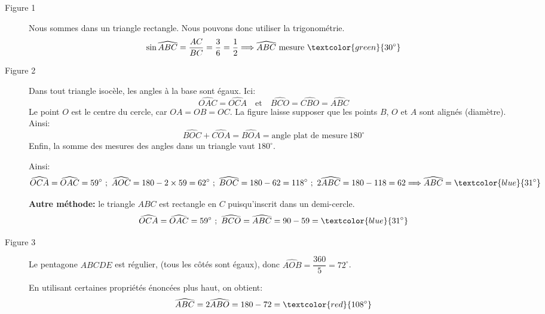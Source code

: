 \begin{description}
\item[Figure 1] Nous sommes dans un triangle rectangle. Nous pouvons donc utiliser la trigonométrie.
\[
\sin\widehat{ABC}=\frac{AC}{BC}=\frac{3}{6}=\frac{1}{2}\Longrightarrow \widehat{ABC}\ \text{mesure}\ \textcolor{green}{30^{\circ}}
\]
\item[Figure 2] Dans tout triangle isocèle, les angles à la base sont égaux. Ici:
\[
\widehat{OAC}=\widehat{OCA}\quad\text{et}\quad\widehat{BCO}=\widehat{CBO}=\widehat{ABC}
\]
Le point $O$ est le centre du cercle, car $OA=OB=OC$. La figure laisse supposer que les points $B$, $O$ et $A$ sont alignés (diamètre). Ainsi:
\[
\widehat{BOC}+\widehat{COA}=\widehat{BOA}=\text{angle plat de mesure}\ 180^{\circ}
\]
Enfin, la somme des mesures des angles dans un triangle vaut $180^{\circ}$.

Ainsi:
\[
\widehat{OCA}=\widehat{OAC}=59^{\circ}\ ;\ \widehat{AOC}=180-2\times 59=62^{\circ}\ ;\ \widehat{BOC}=180-62=118^{\circ}\ ;\ 2\widehat{ABC}=180-118=62\Longrightarrow \widehat{ABC}=\textcolor{blue}{31^{\circ}}
\]

\textbf{Autre méthode:} le triangle $ABC$ est rectangle en $C$ puisqu'inscrit dans un demi-cercle.
\[
\widehat{OCA}=\widehat{OAC}=59^{\circ}\ ;\ \widehat{BCO}=\widehat{ABC}=90-59=\textcolor{blue}{31^{\circ}}
\]
\item[Figure 3] Le pentagone $ABCDE$ est régulier, (tous les côtés sont égaux), donc $\widehat{AOB}=\dfrac{360}{5}=72^{\circ}$.

En utilisant certaines propriétés énoncées plus haut, on obtient:
\[
\widehat{ABC}=2\widehat{ABO}=180-72=\textcolor{red}{108^{\circ}}
\]
\end{description}
